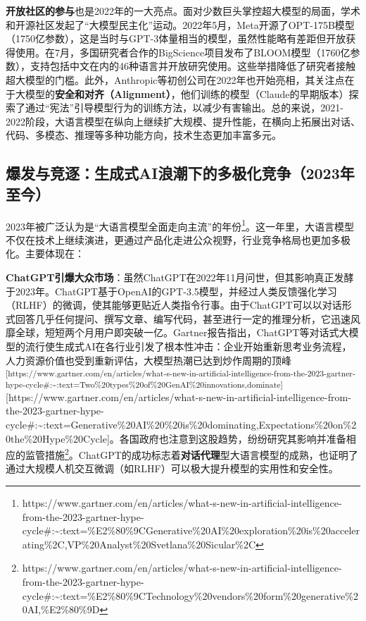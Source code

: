 \documentclass[
  letterpaper,
]{scrbook}
\begin{document}
\textbf{开放社区的参与}也是2022年的一大亮点。面对少数巨头掌控超大模型的局面，学术和开源社区发起了``大模型民主化''运动。2022年5月，Meta开源了OPT-175B模型（1750亿参数），这是当时与GPT-3体量相当的模型，虽然性能略有差距但开放获得使用。在7月，多国研究者合作的BigScience项目发布了BLOOM模型（1760亿参数），支持包括中文在内的46种语言并开放研究使用。这些举措降低了研究者接触超大模型的门槛。此外，Anthropic等初创公司在2022年也开始亮相，其关注点在于大模型的\textbf{安全和对齐（Alignment）}，他们训练的模型（Claude的早期版本）探索了通过``宪法''引导模型行为的训练方法，以减少有害输出。总的来说，2021-2022阶段，大语言模型在纵向上继续扩大规模、提升性能，在横向上拓展出对话、代码、多模态、推理等多种功能方向，技术生态更加丰富多元。

\subsection{爆发与竞逐：生成式AI浪潮下的多极化竞争（2023年至今）}\label{ux7206ux53d1ux4e0eux7adeux9010ux751fux6210ux5f0faiux6d6aux6f6eux4e0bux7684ux591aux6781ux5316ux7adeux4e892023ux5e74ux81f3ux4eca}

2023年被广泛认为是``大语言模型全面走向主流''的年份\footnote{https://www.gartner.com/en/articles/what-s-new-in-artificial-intelligence-from-the-2023-gartner-hype-cycle\#:\textasciitilde:text=\%E2\%80\%9CGenerative\%20AI\%20exploration\%20is\%20accelerating\%2C,VP\%20Analyst\%20Svetlana\%20Sicular\%2C}。这一年里，大语言模型不仅在技术上继续演进，更通过产品化走进公众视野，行业竞争格局也更加多极化。主要体现在：

\textbf{ChatGPT引爆大众市场}：虽然ChatGPT在2022年11月问世，但其影响真正发酵于2023年。ChatGPT基于OpenAI的GPT-3.5模型，并经过人类反馈强化学习（RLHF）的微调，使其能够更贴近人类指令行事。由于ChatGPT可以以对话形式回答几乎任何提问、撰写文章、编写代码，甚至进行一定的推理分析，它迅速风靡全球，短短两个月用户即突破一亿。Gartner报告指出，ChatGPT等对话式大模型的流行使生成式AI在各行业引发了根本性冲击：企业开始重新思考业务流程，人力资源价值也受到重新评估，大模型热潮已达到炒作周期的顶峰\textsuperscript{{[}https://www.gartner.com/en/articles/what-s-new-in-artificial-intelligence-from-the-2023-gartner-hype-cycle\#:\textasciitilde:text=Two\%20types\%20of\%20GenAI\%20innovations,dominate{]}}{[}https://www.gartner.com/en/articles/what-s-new-in-artificial-intelligence-from-the-2023-gartner-hype-cycle\#:\textasciitilde:text=Generative\%20AI\%20\%20is\%20dominating,Expectations\%20on\%20the\%20Hype\%20Cycle{]}。各国政府也注意到这股趋势，纷纷研究其影响并准备相应的监管措施\footnote{https://www.gartner.com/en/articles/what-s-new-in-artificial-intelligence-from-the-2023-gartner-hype-cycle\#:\textasciitilde:text=\%E2\%80\%9CTechnology\%20vendors\%20form\%20generative\%20AI,\%E2\%80\%9D}。ChatGPT的成功标志着\textbf{对话代理}型大语言模型的成熟，也证明了通过大规模人机交互微调（如RLHF）可以极大提升模型的实用性和安全性。
\end{document}
